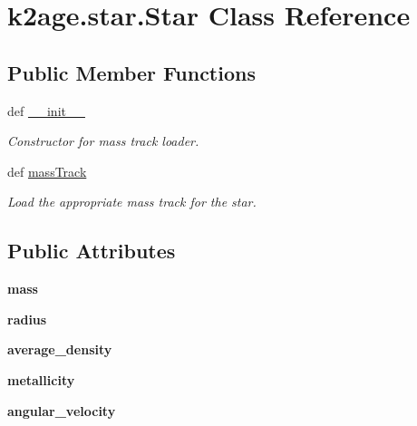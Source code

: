 \hypertarget{classk2age_1_1star_1_1Star}{\section{k2age.\-star.\-Star \-Class \-Reference}
\label{classk2age_1_1star_1_1Star}
}
\subsection*{\-Public \-Member \-Functions}
\begin{DoxyCompactItemize}
\item 
def \hyperlink{classk2age_1_1star_1_1Star_a940118cb64ecf9e47b27653eb1679b6b}{\-\_\-\-\_\-init\-\_\-\-\_\-}
\begin{DoxyCompactList}\small\item\em \-Constructor for mass track loader. \end{DoxyCompactList}\item 
def \hyperlink{classk2age_1_1star_1_1Star_a18cc5747a25894099be6e656f7d9a244}{mass\-Track}
\begin{DoxyCompactList}\small\item\em \-Load the appropriate mass track for the star. \end{DoxyCompactList}\end{DoxyCompactItemize}
\subsection*{\-Public \-Attributes}
\begin{DoxyCompactItemize}
\item 
\hypertarget{classk2age_1_1star_1_1Star_ac585e6ea0a07c2a03f2106039f04d7bd}{{\bfseries mass}}\label{classk2age_1_1star_1_1Star_ac585e6ea0a07c2a03f2106039f04d7bd}

\item 
\hypertarget{classk2age_1_1star_1_1Star_adca76381a8af3a72315d3d0cf56c4161}{{\bfseries radius}}\label{classk2age_1_1star_1_1Star_adca76381a8af3a72315d3d0cf56c4161}

\item 
\hypertarget{classk2age_1_1star_1_1Star_a25d2f6fef67d6f653e4483e75afddc32}{{\bfseries average\-\_\-density}}\label{classk2age_1_1star_1_1Star_a25d2f6fef67d6f653e4483e75afddc32}

\item 
\hypertarget{classk2age_1_1star_1_1Star_a405ce48b9ff583a817398af3c1c5d691}{{\bfseries metallicity}}\label{classk2age_1_1star_1_1Star_a405ce48b9ff583a817398af3c1c5d691}

\item 
\hypertarget{classk2age_1_1star_1_1Star_a68095397d1fa0ba3fe17fc0382fb1110}{{\bfseries angular\-\_\-velocity}}\label{classk2age_1_1star_1_1Star_a68095397d1fa0ba3fe17fc0382fb1110}

\end{DoxyCompactItemize}


